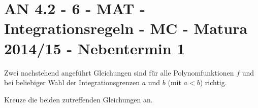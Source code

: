 \section{AN 4.2 - 6 - MAT - Integrationsregeln - MC - Matura 2014/15 - Nebentermin 1}

\begin{beispiel}[AN 4.2]{1} %
Zwei nachstehend angeführt Gleichungen sind für alle Polynomfunktionen $f$ und bei beliebiger Wahl der Integrationsgrenzen $a$ und $b$ (mit $a<b$) richtig. \leer

Kreuze die beiden zutreffenden Gleichungen an. 

\end{beispiel}